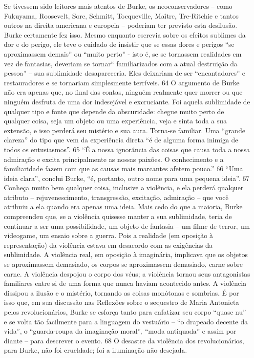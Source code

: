 Se tivessem sido leitores mais atentos de Burke, os neoconservadores – como Fukuyama, Roosevelt, Sore, Schmitt, Tocqueville, Maître, Tre-Ritchie e tantos outros na direita americana e europeia – poderiam ter previsto esta desilusão. Burke certamente fez isso. Mesmo enquanto escrevia sobre os efeitos sublimes da dor e do perigo, ele teve o cuidado de insistir que se essas dores e perigos “se aproximassem demais” ou “muito perto” - isto é, se se tornassem realidades em vez de fantasias, deveriam se tornar“ familiarizados com a atual destruição da pessoa” – sua sublimidade desapareceria. Eles deixariam de ser “encantadores” e restauradores e se tornariam simplesmente terríveis.
 {\color{blue} 64}  
O argumento de Burke não era apenas que, no final das contas, ninguém realmente quer morrer ou que ninguém desfruta de uma dor indesejável e excruciante. Foi aquela sublimidade de qualquer tipo e fonte que depende da obscuridade: chegue muito perto de qualquer coisa, seja um objeto ou uma experiência, veja e sinta toda a sua extensão, e isso perderá seu mistério e sua aura. Torna-se familiar. Uma “grande clareza” do tipo que vem da experiência direta “é de alguma forma inimiga de todos os entusiasmos”.
 {\color{blue} 65}  
“É a nossa ignorância das coisas que causa toda a nossa admiração e excita principalmente as nossas paixões. O conhecimento e a familiaridade fazem com que as causas mais marcantes afetem pouco.”
 {\color{blue} 66}  
“Uma ideia clara”, conclui Burke, “é, portanto, outro nome para uma pequena ideia”.
 {\color{blue} 67}  
Conheça muito bem qualquer coisa, inclusive a violência, e ela perderá qualquer atributo – rejuvenescimento, transgressão, excitação, admiração – que você atribuiu a ela quando era apenas uma ideia. Mais cedo do que a maioria, Burke compreendeu que, se a violência quisesse manter a sua sublimidade, teria de continuar a ser uma possibilidade, um objeto de fantasia – um filme de terror, um videogame, um ensaio sobre a guerra. Pois a realidade (em oposição à representação) da violência estava em desacordo com as exigências da sublimidade. A violência real, em oposição à imaginária, implicava que os objetos se aproximassem demasiado, os corpos se aproximassem demasiado, carne sobre carne. A violência despojou o corpo dos véus; a violência tornou seus antagonistas familiares entre si de uma forma que nunca haviam acontecido antes. A violência dissipou a ilusão e o mistério, tornando as coisas monótonas e sombrias. É por isso que, em sua discussão nas Reflexões sobre o sequestro de Maria Antonieta pelos revolucionários, Burke se esforça tanto para enfatizar seu corpo “quase nu” e se volta tão facilmente para a linguagem do vestuário – “o drapeado decente da vida”, o “guarda-roupa da imaginação moral”, “moda antiquada” e assim por diante – para descrever o evento.
 {\color{blue} 68}  
O desastre da violência dos revolucionários, para Burke, não foi crueldade; foi a iluminação não desejada.
 
